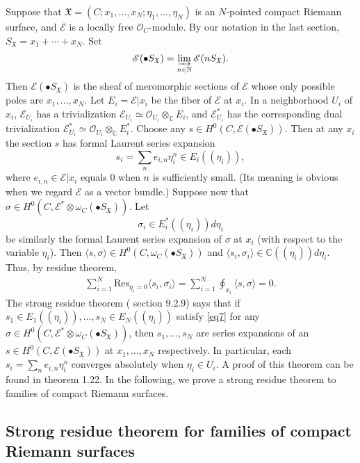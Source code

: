 \documentclass[12pt,b5paper,notitlepage]{report}
\theoremstyle{definition}
\theoremstyle{plain}
\newcommand{\fk}{\mathfrak}
\newcommand{\Res}{\mathrm{Res}}
\newcommand{\bk}[1]{\langle {#1}\rangle}
\newcommand{\scr}{\mathscr}
\newcommand{\SX}{S_{\fk X}}
\numberwithin{equation}{section}
\begin{document}
Suppose that $\fk X=(C;x_1,\dots,x_N;\eta_1,\dots,\eta_N)$ is an $N$-pointed compact Riemann surface, and $\scr E$ is a locally free $\scr O_C$-module. By our notation in the last section, $\SX=x_1+\cdots+x_N$. Set \index{ESX@$\scr E(\bullet\SX)$} 
\begin{align}
\scr E(\bullet\SX)=\varinjlim_{n\in\mathbb N}\scr E(n\SX).\label{eq9}
\end{align}
Then $\scr E(\bullet\SX)$ is the sheaf of meromorphic sections of $\scr E$ whose only possible poles are $x_1,\dots,x_N$. Let $E_i=\scr E|x_i$ be the fiber of $\scr E$ at $x_i$. In a neighborhood $U_i$ of $x_i$, $\scr E_{U_i}$ has a trivialization $\scr E_{U_i}\simeq\scr O_{U_i}\otimes_{\mathbb C}E_i$, and  $\scr E^*_{U_i}$ has the corresponding dual trivialization $\scr E^*_{U_i}\simeq\scr O_{U_i}\otimes_{\mathbb C}E_i^*$. Choose any $s\in H^0(C,\scr E(\bullet\SX))$.  Then at any $x_i$ the section $s$ has formal Laurent series expansion
$$s_i=\sum_n e_{i,n}\eta_i^n\in E_i((\eta_i)),$$
where $e_{i,n}\in\scr E|x_i$ equals $0
$ when $n$ is sufficiently small.  (Its meaning is obvious when we regard $\scr E$ as a vector bundle.) Suppose now that $\sigma\in H^0(C,\scr E^*\otimes\omega_C(\bullet\SX))$. Let
$$\sigma_i\in E_i^*((\eta_i))d\eta_i$$
be similarly the formal Laurent series expansion of $\sigma$ at $x_i$ (with respect to the variable $\eta_i$). Then $\bk{s,\sigma}\in H^0(C,\omega_C(\bullet\SX))$ and $\bk{s_i,\sigma_i}\in\mathbb C((\eta_i))d\eta_i$. Thus, by residue theorem,
\begin{align}
\sum_{i=1}^N\Res_{\eta_i=0}\bk{s_i,\sigma_i}=\sum_{i=1}^N\oint_{x_i}\bk{s,\sigma}=0.\label{eq7}
\end{align}
The strong residue theorem  (\cite{FB04} section 9.2.9) says that if $s_1\in E_1((\eta_i)),\dots,s_N\in E_N((\eta_i))$ satisfy \eqref{eq7} for any  $\sigma\in H^0(C,\scr E^*\otimes\omega_C(\bullet\SX))$, then $s_1,\dots,s_N$ are series expansions of an $s\in H^0(C,\scr E(\bullet\SX))$ at $x_1,\dots,x_N$ respectively. In particular, each  $s_i=\sum_n e_{i,n}\eta_i^n$ converges absolutely when $\eta_i\in U_i$. A proof of this theorem can be found in \cite{Ueno08} theorem 1.22. In the following, we prove a strong residue theorem to families of compact Riemann surfaces.

\subsection*{Strong residue theorem for families of compact Riemann surfaces}
\end{document}
